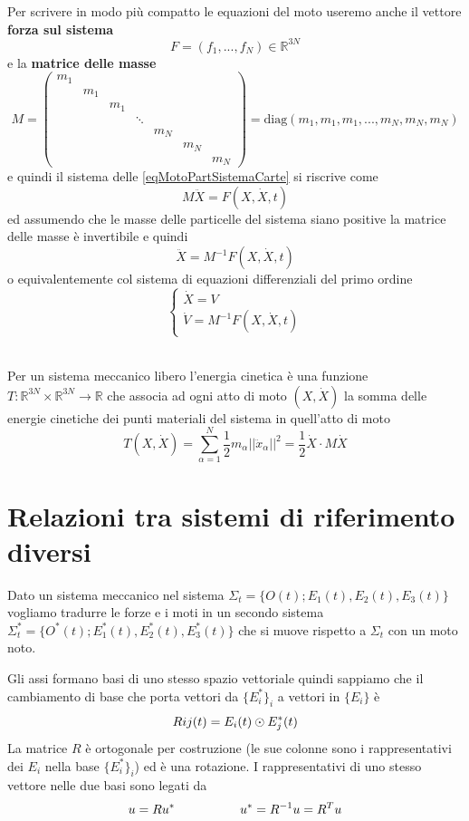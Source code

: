 \documentclass[11pt,a4paper,twoside]{book}
\newenvironment{definizione}[1][\empty]{\begin{Definizione}{
\ifx\empty#1\relax\else\mdseries\itshape#1\\\fi
}{}}{\end{Definizione}}
\theoremstyle{esss}
\theoremstyle{dotless}
\numberwithin{equation}{section} %
\begin{document}
Per scrivere in modo più compatto le equazioni del moto useremo anche il vettore \textbf{forza sul sistema}
\[
F=(f_1,...,f_N)\in\mathbb{R}^{3N}
\]
e la \textbf{matrice delle masse} 
\[
M=\left(\begin{array}{ccccccc}
m_1 \\
& m_1 \\
& & m_1 \\
& & & \ddots \\
& & & & m_N \\
& & & & & m_N \\
& & & & & & m_N
\end{array}\right)=\text{diag}(m_1,m_1,m_1,...,m_N,m_N,m_N)
\]
e quindi il sistema delle \eqref{eqMotoPartSistemaCarte} si riscrive come
\[
M\ddot{X}=F(X,\dot{X},t)
\]
ed assumendo che le masse delle particelle del sistema siano positive la matrice delle masse è invertibile e quindi
\begin{equation}
\ddot{X}=M^{-1}F(X,\dot{X},t)
\end{equation}
o equivalentemente col sistema di equazioni differenziali del primo ordine
\begin{equation}
\begin{cases}
\dot{X}=V \\
\dot{V}=M^{-1}F(X,\dot{X},t)
\end{cases}
\end{equation}


\begin{definizione}
Per un sistema meccanico libero l'energia cinetica è una funzione $T:\mathbb{R}^{3N}\times\mathbb{R}^{3N}\rightarrow\mathbb{R}$ che associa ad ogni atto di moto $(X,\dot{X})$ la somma delle energie cinetiche dei punti materiali del sistema in quell'atto di moto
\[
T(X,\dot{X})=\sum_{\alpha=1}^N \dfrac{1}{2} m_{\alpha} \left|\left| \ddot{x}_\alpha \right|\right|^2 = \dfrac{1}{2}  \dot{X} \cdot M\dot{X}
\]
\end{definizione}

\section{Relazioni tra sistemi di riferimento diversi}

Dato un sistema meccanico nel sistema $\Sigma_t=\{O(t);E_1(t),E_2(t),E_3(t)\}$ vogliamo tradurre le forze e i moti in un secondo sistema $\Sigma^*_t=\{O^*(t);E_1^*(t),E_2^*(t),E_3^*(t)\}$ che si muove rispetto a $\Sigma_t$ con un moto noto.

Gli assi formano basi di uno stesso spazio vettoriale quindi sappiamo che il cambiamento di base che porta vettori da $\{E_i^*\}_i$ a vettori in $\{E_i\}$ è
\begin{equation}
Rij(t)=E_i(t)\odot E_j^*(t)
\end{equation}
La matrice $R$ è ortogonale per costruzione (le sue colonne sono i rappresentativi dei $E_i$ nella base $\{E_i^*\}_i$) ed è una rotazione.
I rappresentativi di uno stesso vettore nelle due basi sono legati da
\begin{equation}
u=Ru^* \hspace{0.15\linewidth} u^*=R^{-1}u=R^Tu
\end{equation}
\end{document}
